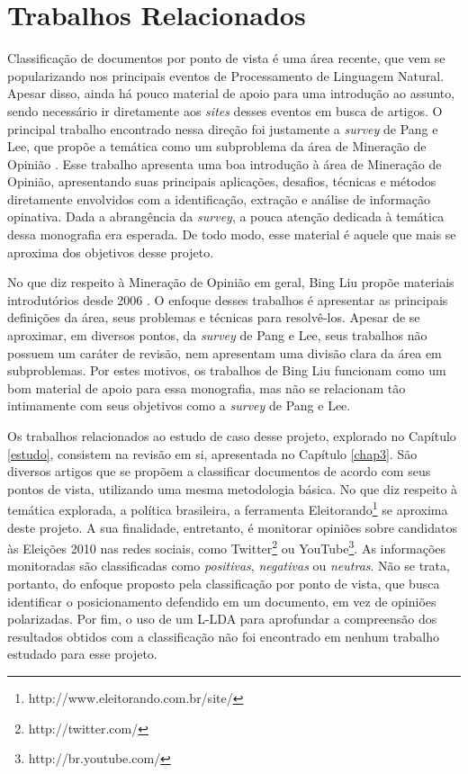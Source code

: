 \section{Trabalhos Relacionados}
\label{relacionados}

Classificação de documentos por ponto de vista é uma área recente, que vem se popularizando nos principais eventos de Processamento de Linguagem Natural. Apesar disso, ainda há pouco material de apoio para uma introdução ao assunto, sendo necessário ir diretamente aos \emph{sites} desses eventos em busca de artigos. O principal trabalho encontrado nessa direção foi justamente a \emph{survey} de Pang e Lee, que propõe a temática como um subproblema da área de Mineração de Opinião \cite{omsa}. Esse trabalho apresenta uma boa introdução à área de Mineração de Opinião, apresentando suas principais aplicações, desafios, técnicas e métodos diretamente envolvidos com a identificação, extração e análise de informação opinativa. Dada a abrangência da \emph{survey}, a pouca atenção dedicada à temática dessa monografia era esperada. De todo modo, esse material é aquele que mais se aproxima dos objetivos desse projeto.

No que diz respeito à Mineração de Opinião em geral, Bing Liu propõe materiais introdutórios desde 2006 \cite{bingliu} \cite{handbook-liu}. O enfoque desses trabalhos é apresentar as principais definições da área, seus problemas e técnicas para resolvê-los. Apesar de se aproximar, em diversos pontos, da \emph{survey} de Pang e Lee, seus trabalhos não possuem um caráter de revisão, nem apresentam uma divisão clara da área em subproblemas. Por estes motivos, os trabalhos de Bing Liu funcionam como um bom material de apoio para essa monografia, mas não se relacionam tão intimamente com seus objetivos como a \emph{survey} de Pang e Lee.

Os trabalhos relacionados ao estudo de caso desse projeto, explorado no Capítulo \ref{estudo}, consistem na revisão em si, apresentada no Capítulo \ref{chap3}. São diversos artigos que se propõem a classificar documentos de acordo com seus pontos de vista, utilizando uma mesma metodologia básica. No que diz respeito à temática explorada, a política brasileira, a ferramenta Eleitorando\footnote{http://www.eleitorando.com.br/site/} se aproxima deste projeto. A sua finalidade, entretanto, é monitorar opiniões sobre candidatos às Eleições 2010 nas redes sociais, como Twitter\footnote{http://twitter.com/} ou YouTube\footnote{http://br.youtube.com/}. As informações monitoradas são classificadas como \emph{positivas}, \emph{negativas} ou \emph{neutras}. Não se trata, portanto, do enfoque proposto pela classificação por ponto de vista, que busca identificar o posicionamento defendido em um documento, em vez de opiniões polarizadas. Por fim, o uso de um L-LDA para aprofundar a compreensão dos resultados obtidos com a classificação não foi encontrado em nenhum trabalho estudado para esse projeto.     



